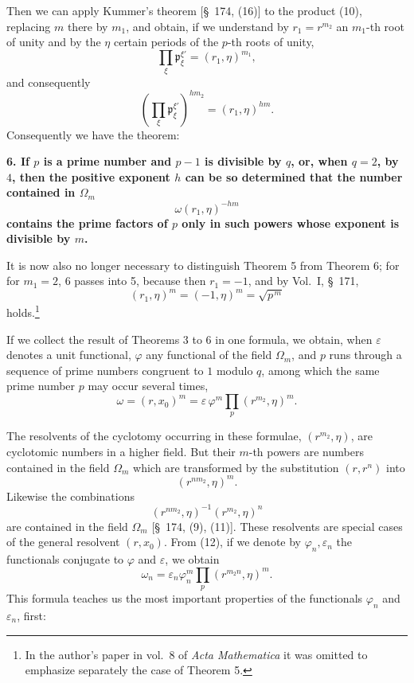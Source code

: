 \documentclass[11pt]{article}
\providecommand{\eps}{\varepsilon}
\newcommand{\pp}{\mathfrak p}
\providecommand{\eps}{\varepsilon}
\begin{document}
Then we can apply Kummer's theorem [\S~174, (16)] to the product (10), replacing $m$ there by $m_1$, and obtain, if we understand by $r_1=r^{m_2}$ an $m_1$-th root of unity and by the $\eta$ certain periods of the $p$-th roots of unity,
\[
  \prod_\xi \pp_\xi^{\xi'}=(r_1,\eta)^{m_1},
\]
and consequently
\begin{equation}
  \left(\prod_\xi \pp_\xi^{\xi'}\right)^{hm_2}=(r_1,\eta)^{hm}.
\tag{11}
\end{equation}
Consequently we have the theorem:

\textbf{6. If $p$ is a prime number and $p-1$ is divisible by $q$, or, when $q=2$, by $4$, then the positive exponent $h$ can be so determined that the number contained in $\Omega_m$}
\[
  \omega(r_1,\eta)^{-hm}
\]
\textbf{contains the prime factors of $p$ only in such powers whose exponent is divisible by $m$.}

It is now also no longer necessary to distinguish Theorem 5 from Theorem 6; for for $m_1=2$, 6 passes into 5, because then $r_1=-1$, and by Vol.~I, \S~171,
\[
  (r_1,\eta)^m=(-1,\eta)^m=\sqrt{p^{\,m}}
\]
holds.\footnote{In the author's paper in vol.~8 of \textit{Acta Mathematica} it was omitted to emphasize separately the case of Theorem 5.}

If we collect the result of Theorems 3 to 6 in one formula, we obtain, when $\eps$ denotes a unit functional, $\varphi$ any functional of the field $\Omega_m$, and $p$ runs through a sequence of prime numbers congruent to $1$ modulo $q$, among which the same prime number $p$ may occur several times,
\begin{equation}
  \omega=(r,x_0)^m=\eps\,\varphi^m\prod_p (r^{m_2},\eta)^m.
\tag{12}
\end{equation}

The resolvents of the cyclotomy occurring in these formulae, $(r^{m_2},\eta)$, are cyclotomic numbers in a higher field. But their $m$-th powers are numbers contained in the field $\Omega_m$ which are transformed by the substitution $(r,r^n)$ into
\[
  (r^{n m_2},\eta)^m.
\]
Likewise the combinations
\begin{equation}
  (r^{n m_2},\eta)^{-1}(r^{m_2},\eta)^n
\tag{13}
\end{equation}
are contained in the field $\Omega_m$ [\S~174, (9), (11)]. These resolvents are special cases of the general resolvent $(r,x_0)$. From (12), if we denote by $\varphi_n,\eps_n$ the functionals conjugate to $\varphi$ and $\eps$, we obtain
\begin{equation}
  \omega_n=\eps_n\varphi_n^m\prod_p (r^{m_2n},\eta)^m.
\tag{14}
\end{equation}
This formula teaches us the most important properties of the functionals $\varphi_n$ and $\eps_n$, first:
\end{document}
